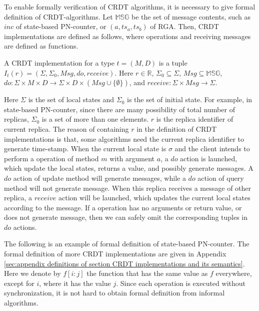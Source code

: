 To enable formally verification of CRDT algorithms, it is necessary to give formal definition of CRDT-algorithms. Let $\mathbb{MSG}$ be the set of message contents, such as $inc$ of state-based PN-counter, or $(a,ts_a,ts_b)$ of RGA. Then, CRDT implementations are defined as follows, where operations and receiving messages are defined as functions.

\begin{definition}
\label{definition:CRDT implementations}
A CRDT implementation for a type $t = (M,D)$ is a tuple $I_t(r) = (\Sigma, \Sigma_0, \mathit{Msg}, \mathit{do},\mathit{receive})$. Here $r \in \mathbb{R}$, $\Sigma_0 \subseteq \Sigma$, $\mathit{Msg} \subseteq \mathbb{MSG}$, $\mathit{do}:\Sigma \times M \times D \rightarrow \Sigma \times D \times (\mathit{Msg} \cup \{ \emptyset \} )$, and $\mathit{receive}: \Sigma \times \mathit{Msg} \rightarrow \Sigma$.
\end{definition}

Here $\Sigma$ is the set of local states and $\Sigma_0$ is the set of initial state. For example, in state-based PN-counter, since there are many possibility of total number of replicas, $\Sigma_0$ is a set of more than one elements. $r$ is the replica identifier of current replica. The reason of containing $r$ in the definition of CRDT implementations is that, some algorithms need the current replica identifier to generate time-stamp. When the current local state is $\sigma$ and the client intends to perform a operation of method $m$ with argument $a$, a $\mathit{do}$ action is launched, which update the local states, returns a value, and possibly generate messages. A $\mathit{do}$ action of update method will generate messages, while a $\mathit{do}$ action of query method will not generate message. When this replica receives a message of other replica, a $\mathit{receive}$ action will be launched, which updates the current local states according to the message. If a operation has no arguments or return value, or does not generate message, then we can safely omit the corresponding tuples in $\mathit{do}$ actions.

The following is an example of formal definition of state-based PN-counter. The formal definition of more CRDT implementations are given in Appendix \ref{sec:appendix definitions of section CRDT implementations and its semantics}. Here we denote by $f[i:j]$ the function that has the same value as $f$ everywhere, except for $i$, where it has the value $j$. Since each operation is executed without synchronization, it is not hard to obtain formal definition from informal algorithms.

